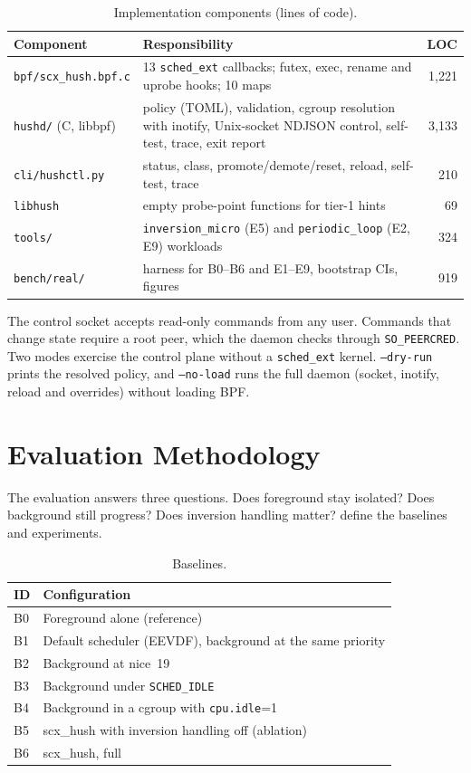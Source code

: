 \documentclass[11pt,a4paper]{article}
\newcommand{\code}[1]{\texttt{#1}}
\begin{document}
\begin{table}[h]
\centering\small
\caption{Implementation components (lines of code).}
\label{tab:components}
\begin{tabularx}{\linewidth}{@{}lXr@{}}
\toprule
Component & Responsibility & LOC \\
\midrule
\code{bpf/scx\_hush.bpf.c} & 13 \code{sched\_ext} callbacks; futex, exec, rename and uprobe hooks; 10 maps & 1{,}221 \\
\code{hushd/} (C, libbpf) & policy (TOML), validation, cgroup resolution with inotify, Unix-socket NDJSON control, self-test, trace, exit report & 3{,}133 \\
\code{cli/hushctl.py} & status, class, promote/demote/reset, reload, self-test, trace & 210 \\
\code{libhush} & empty probe-point functions for tier-1 hints & 69 \\
\code{tools/} & \code{inversion\_micro} (E5) and \code{periodic\_loop} (E2, E9) workloads & 324 \\
\code{bench/real/} & harness for B0--B6 and E1--E9, bootstrap CIs, figures & 919 \\
\bottomrule
\end{tabularx}
\end{table}

The control socket accepts read-only commands from any user. Commands that
change state require a root peer, which the daemon checks through
\code{SO\_PEERCRED}. Two modes exercise the control plane without a
\code{sched\_ext} kernel. \code{--dry-run} prints the resolved policy, and
\code{--no-load} runs the full daemon (socket, inotify, reload and overrides)
without loading BPF.

\section{Evaluation Methodology}
\label{sec:eval}

The evaluation answers three questions. Does foreground stay isolated? Does
background still progress? Does inversion handling matter?
 define the baselines and experiments.

\begin{table}[h]
\centering\small
\caption{Baselines.}
\label{tab:baselines}
\begin{tabular}{@{}ll@{}}
\toprule
ID & Configuration \\
\midrule
B0 & Foreground alone (reference) \\
B1 & Default scheduler (EEVDF), background at the same priority \\
B2 & Background at nice~19 \\
B3 & Background under \code{SCHED\_IDLE} \\
B4 & Background in a cgroup with \code{cpu.idle}=1 \\
B5 & scx\_hush with inversion handling off (ablation) \\
B6 & scx\_hush, full \\
\bottomrule
\end{tabular}
\end{table}
\end{document}

